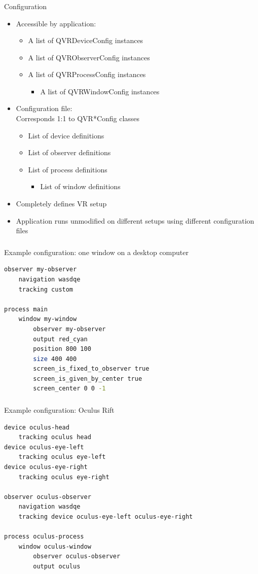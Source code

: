 \documentclass[utf8,stillsansserifmath,fleqn,t]{beamer}
\begin{document}
\begin{frame}
\frametitle{\insertsection}
Configuration
\begin{itemize}
\item Accessible by application:
    \begin{itemize}
    \item A list of QVRDeviceConfig instances
    \item A list of QVRObserverConfig instances
    \item A list of QVRProcessConfig instances
        \begin{itemize}
        \item A list of QVRWindowConfig instances
        \end{itemize}
    \end{itemize}
\item Configuration file:\\
    Corresponds 1:1 to QVR*Config classes
    \begin{itemize}
    \item List of device definitions
    \item List of observer definitions
    \item List of process definitions
        \begin{itemize}
        \item List of window definitions
        \end{itemize}
    \end{itemize}
\item Completely defines VR setup
\item Application runs unmodified on different setups using different
configuration files
\end{itemize}
\end{frame}

\begin{frame}[fragile]
\frametitle{\insertsection}
Example configuration: one window on a desktop computer
\begin{lstlisting}[language=sh]
observer my-observer
    navigation wasdqe
    tracking custom

process main
    window my-window
        observer my-observer
        output red_cyan
        position 800 100
        size 400 400
        screen_is_fixed_to_observer true
        screen_is_given_by_center true
        screen_center 0 0 -1
\end{lstlisting}
\end{frame}

\begin{frame}[fragile]
\frametitle{\insertsection}
Example configuration: Oculus Rift
\begin{lstlisting}[language=sh]
device oculus-head
    tracking oculus head
device oculus-eye-left
    tracking oculus eye-left
device oculus-eye-right
    tracking oculus eye-right

observer oculus-observer
    navigation wasdqe
    tracking device oculus-eye-left oculus-eye-right

process oculus-process
    window oculus-window
        observer oculus-observer
        output oculus
\end{lstlisting}
\end{frame}
\end{document}
